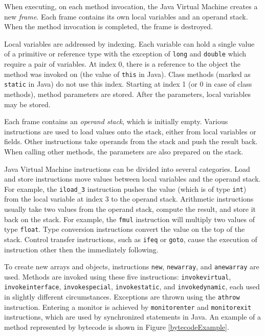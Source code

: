 When executing, on each method invocation, the Java Virtual Machine creates a
new \emph{frame}. Each frame contains its own local variables and an operand
stack. When the method invocation is completed, the frame is destroyed.

Local variables are addressed by indexing. Each variable can hold a single value
of a primitive or reference type with the exception of \texttt{long} and
\texttt{double} which require a pair of variables. At index 0, there is a
reference to the object the method was invoked on (the value of \texttt{this} in
Java). Class methods (marked as \texttt{static} in Java) do not use this index.
Starting at index 1 (or 0 in case of class methods), method parameters are
stored. After the parameters, local variables may be stored.

Each frame contains an \emph{operand stack}, which is initially empty. Various
instructions are used to load values onto the stack, either from local variables
or fields. Other instructions take operands from the stack and push the result
back. When calling other methods, the parameters are also prepared on the stack.

Java Virtual Machine instructions can be divided into several categories. Load
and store instructions move values between local variables and the operand
stack. For example, the \texttt{iload\_3} instruction pushes the value (which is
of type \texttt{int}) from the local variable at index 3 to the operand stack.
Arithmetic instructions usually take two values from the operand stack, compute
the result, and store it back on the stack. For example, the \texttt{fmul}
instruction will multiply two values of type \texttt{float}. Type conversion
instructions convert the value on the top of the stack. Control transfer
instructions, such as \texttt{ifeq} or \texttt{goto}, cause the execution of
instruction other then the immediately following.

To create new arrays and objects, instructions \texttt{new}, \texttt{newarray},
and \texttt{anewarray} are used. Methods are invoked using these five
instructions: \texttt{invokevirtual}, \texttt{invokeinterface},
\texttt{invokespecial}, \texttt{invokestatic}, and \texttt{invokedynamic}, each
used in slightly different circumstances. Exceptions are thrown using the
\texttt{athrow} instruction. Entering a monitor is achieved by
\texttt{monitorenter} and \texttt{monitorexit} instructions, which are used by
synchronized statements in Java. An example of a method represented by bytecode
is shown in Figure \ref{bytecodeExample}.

